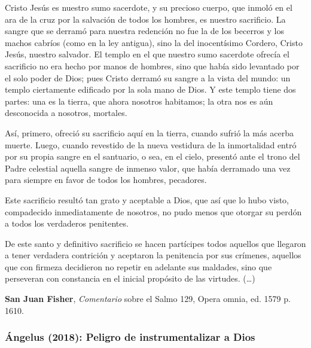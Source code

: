 \begin{patercite}
Cristo Jesús es nuestro sumo sacerdote, y su precioso cuerpo, que inmoló en el ara de la cruz por la salvación de todos los hombres, es nuestro sacrificio. La sangre que se derramó para nuestra redención no fue la de los becerros y los machos cabríos (como en la ley antigua), sino la del inocentísimo Cordero, Cristo Jesús, nuestro salvador. El templo en el que nuestro sumo sacerdote ofrecía el sacrificio no era hecho por manos de hombres, sino que había sido levantado por el solo poder de Dios; pues Cristo derramó su sangre a la vista del mundo: un templo ciertamente edificado por la sola mano de Dios. Y este templo tiene dos partes: una es la tierra, que ahora nosotros habitamos; la otra nos es aún desconocida a nosotros, mortales.

Así, primero, ofreció su sacrificio aquí en la tierra, cuando sufrió la más acerba muerte. Luego, cuando revestido de la nueva vestidura de la inmortalidad entró por su propia sangre en el santuario, o sea, en el cielo, presentó ante el trono del Padre celestial aquella sangre de inmenso valor, que había derramado una vez para siempre en favor de todos los hombres, pecadores.

Este sacrificio resultó tan grato y aceptable a Dios, que así que lo hubo visto, compadecido inmediatamente de nosotros, no pudo menos que otorgar su perdón a todos los verdaderos penitentes.

De este santo y definitivo sacrificio se hacen partícipes todos aquellos que llegaron a tener verdadera contrición y aceptaron la penitencia por sus crímenes, aquellos que con firmeza decidieron no repetir en adelante sus maldades, sino que perseveran con constancia en el inicial propósito de las virtudes. (\ldots)

\textbf{San Juan Fisher}, \textit{Comentario} sobre el Salmo 129, Opera omnia, ed. 1579 p. 1610.
\end{patercite}
\label{b2-03-03-2015A}

\newpage 
\subsubsection{Ángelus (2018): Peligro de instrumentalizar a Dios}


